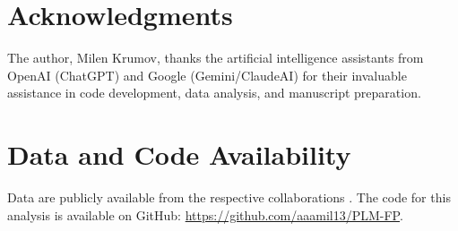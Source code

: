 \documentclass[12pt, a4paper]{article}
\begin{document}
\section*{Acknowledgments}
The author, Milen Krumov, thanks the artificial intelligence assistants from OpenAI (ChatGPT) and Google (Gemini/ClaudeAI) for their invaluable assistance in code development, data analysis, and manuscript preparation.

\section*{Data and Code Availability}
Data are publicly available from the respective collaborations \cite{PantheonPlus, BAO_compilation, Planck2018}. The code for this analysis is available on GitHub: \href{https://github.com/aaamil13/PLM-FP}{https://github.com/aaamil13/PLM-FP}.

\end{document}
